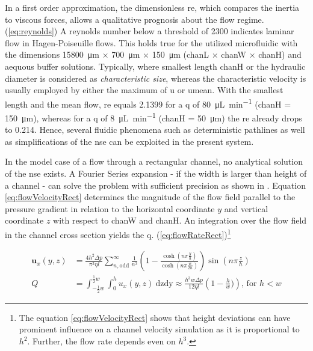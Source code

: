 In a first order approximation, the dimensionless \gls{re}, which compares the inertia to viscous forces, allows a qualitative prognosis about the flow regime. (\cref{eq:reynolds}) A reynolds number below a threshold of 2300 indicates laminar flow in Hagen-Poiseuille flows. This holds true for the utilized microfluidic with the dimensions \SI{15800}{\micro\meter} $\times$ \SI{700}{\micro\meter} $\times$ \SI{150}{\micro\meter} (\gls{chanL} $\times$ \gls{chanW} $\times$ \gls{chanH}) and aequous buffer solutions. Typically, where smallest length \gls{chanH} or the hydraulic diameter is considered as \textit{characteristic size}, whereas the characteristic velocity is usually employed by either the maximum of \gls{u} or \gls{umean}. With the smallest length and the mean flow, \gls{re} equals \num{2.1399} for a \gls{q} of \SI{80}{\micro\liter\per\minute} (\gls{chanH} = \SI{150}{\micro\meter}), whereas for a \gls{q} of \SI{8}{\micro\liter\per\minute} (\gls{chanH} = \SI{50}{\micro\meter}) the \acrlong{re} already drops to \num{0.214}.  Hence, several fluidic phenomena such as deterministic pathlines as well as simplifications of the \gls{nse} can be exploited in the present system. 

In the model case of a flow through a rectangular channel, no analytical solution of the \gls{nse} exists. A Fourier Series expansion - if the width is larger than height of a channel - can solve the problem with sufficient precision as shown in \citet{lit:fluidic:bruus}. Equation \cref{eq:flowVelocityRect} determines the magnitude of the flow field parallel to the pressure gradient in relation to the horizontal coordinate $y$ and vertical coordinate $z$ with respect to \gls{chanW} and \gls{chanH}. An integration over the flow field in the channel cross section yields the \gls{q}. (\cref{eq:flowRateRect})\footnote{The equation \cref{eq:flowVelocityRect} shows that height deviations can have prominent influence on a channel velocity simulation as it is proportional to $h^2$. Further, the flow rate depends even on $h^3$.} 

  \begin{align}
\mathbf{u}   _x(y,z) &= \frac{4 h^2 \Delta p}{\pi^3 \eta l} \sum_{n,\text{odd}}^{\infty} \frac{1}{n^3} \left( 1- \frac{\cosh (n \pi \frac{y}{h})}{\cosh (n \pi \frac{w}{2h})} \right) \sin (n \pi \frac{z}{h}) \label{eq:flowVelocityRect} \\
  Q    &= \int_{-\frac{1}{2}w}^{\frac{1}{2}w} \int_{0}^{h} u   _x(y,z) \ \mathrm{dzdy} \approx \frac{h^3 w \Delta p}{12 \eta l} \left( 1 - \frac{h}{w}) \right) \label{eq:flowRateRect} \text{, \ for \ } h < w
\end{align}


